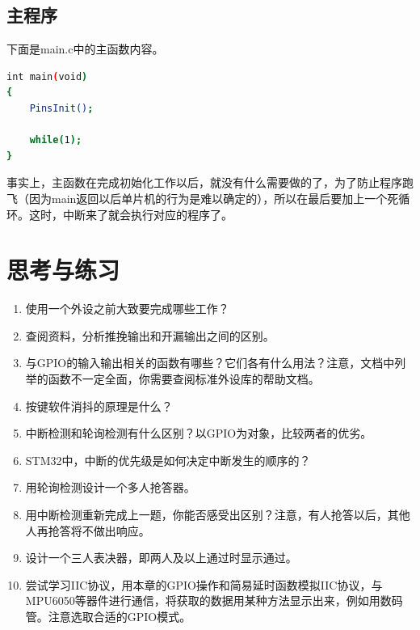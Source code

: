 	\subsection{主程序}
		下面是main.c中的主函数内容。
		\par 
		\begin{lstlisting}[language=bash, style=customStyleC, caption=主程序]
int main(void)
{
	PinsInit();
	
	while(1);
}
		\end{lstlisting}
		\par 
		事实上，主函数在完成初始化工作以后，就没有什么需要做的了，为了防止程序跑飞（因为main返回以后单片机的行为是难以确定的），所以在最后要加上一个死循环。这时，中断来了就会执行对应的程序了。

\section{思考与练习}
\begin{enumerate}
	\item 使用一个外设之前大致要完成哪些工作？
	\item 查阅资料，分析推挽输出和开漏输出之间的区别。
	\item 与GPIO的输入输出相关的函数有哪些？它们各有什么用法？注意，文档中列举的函数不一定全面，你需要查阅标准外设库的帮助文档。
	\item 按键软件消抖的原理是什么？
	\item 中断检测和轮询检测有什么区别？以GPIO为对象，比较两者的优劣。
	\item STM32中，中断的优先级是如何决定中断发生的顺序的？
	\item 用轮询检测设计一个多人抢答器。
	\item 用中断检测重新完成上一题，你能否感受出区别？注意，有人抢答以后，其他人再抢答将不做出响应。
	\item 设计一个三人表决器，即两人及以上通过时显示通过。
	\item 尝试学习IIC协议，用本章的GPIO操作和简易延时函数模拟IIC协议，与MPU6050等器件进行通信，将获取的数据用某种方法显示出来，例如用数码管。注意选取合适的GPIO模式。
\end{enumerate}















